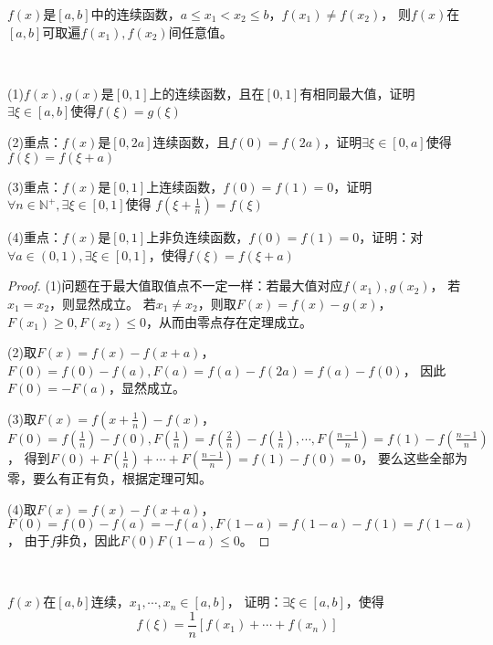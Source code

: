 \begin{theorem}[介值性定理]
  $f(x)$是$[a,b]$中的连续函数，$a \leq x_1 < x_2 \leq b$，$f(x_1) \neq f(x_2)$，
  则$f(x)$在$[a,b]$可取遍$f(x_1),f(x_2)$间任意值。
\end{theorem}

~

\begin{exercise}[构造辅助函数]
  (1)$f(x),g(x)$是$[0,1]$上的连续函数，且在$[0,1]$有相同最大值，证明$\exists \xi \in [a,b]$使得$f(\xi) = g(\xi)$

  (2)重点：$f(x)$是$[0,2a]$连续函数，且$f(0) = f(2a)$，证明$\exists \xi \in [0,a]$使得$f(\xi) = f(\xi + a)$

  (3)重点：$f(x)$是$[0,1]$上连续函数，$f(0) = f(1) = 0$，证明$\forall n \in \mathbb{N}^+, \exists \xi \in [0,1]$使得
  $f(\xi + \frac{1}{n} ) = f(\xi)$

  (4)重点：$f(x)$是$[0,1]$上非负连续函数，$f(0) = f(1) = 0$，证明：对$\forall a \in (0,1), \exists \xi \in [0,1]$，使得$f(\xi) = f(\xi + a)$
\end{exercise}

\begin{proof}
  (1)问题在于最大值取值点不一定一样：若最大值对应$f(x_1),g(x_2)$，
  若$x_1 = x_2$，则显然成立。
  若$x_1 \neq x_2$，则取$F(x) = f(x) - g(x)$，$F(x_1) \geq 0, F(x_2) \leq 0$，从而由零点存在定理成立。

  (2)取$F(x) = f(x) - f(x + a)$，$F(0) = f(0) - f(a), F(a) = f(a) - f(2a) = f(a) - f(0)$，
  因此$F(0) = - F(a)$，显然成立。

  (3)取$F(x) = f(x + \frac{1}{n}) - f(x)$，
  $F(0) = f(\frac{1}{n}) - f(0), F(\frac{1}{n}) = f(\frac{2}{n}) - f(\frac{1}{n}),\cdots, F(\frac{n-1}{n}) = f(1) - f(\frac{n-1}{n})$，
  得到$F(0) + F(\frac{1}{n}) + \cdots + F(\frac{n-1}{n}) = f(1) - f(0) = 0$，
  要么这些全部为零，要么有正有负，根据定理可知。

  (4)取$F(x) = f(x) - f(x+a)$，$F(0) = f(0) - f(a) = -f(a), F(1-a) = f(1-a) - f(1) = f(1-a)$，
  由于$f$非负，因此$F(0)F(1-a) \leq 0$。
\end{proof}

~

\begin{theorem}[连续函数平均值定理]
  $f(x)$在$[a,b]$连续，$x_1,\cdots,x_n \in [a,b]$，
  证明：$\exists \xi \in [a,b]$，使得
  \begin{equation*}
    f(\xi) = \frac{1}{n} [f(x_1) + \cdots + f(x_n)]
  \end{equation*}
\end{theorem}

